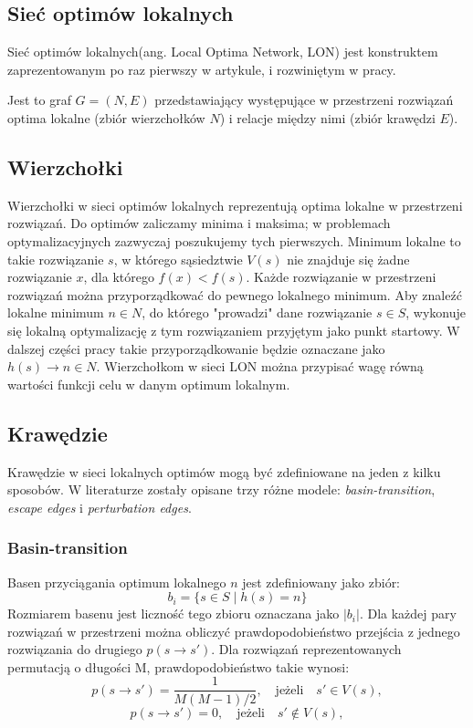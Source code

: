 \subsection{Sieć optimów lokalnych}
Sieć optimów lokalnych(ang. Local Optima Network, LON) jest konstruktem zaprezentowanym po raz pierwszy w artykule\cite{PhysRevE.78.066114},
i rozwiniętym w pracy\cite{DBLP:journals/corr/OchoaVDT14}.

Jest to graf $G = (N, E)$ przedstawiający występujące w przestrzeni rozwiązań optima lokalne (zbiór wierzchołków $N$)
i relacje między nimi (zbiór krawędzi $E$).

\subsection{Wierzchołki}
Wierzchołki w sieci optimów lokalnych reprezentują optima lokalne w przestrzeni rozwiązań.
Do optimów zaliczamy minima i maksima; w problemach optymalizacyjnych zazwyczaj poszukujemy tych pierwszych.
Minimum lokalne to takie rozwiązanie $s$, w którego sąsiedztwie $V(s)$ nie znajduje się żadne rozwiązanie $x$, dla którego $f(x) < f(s)$.
Każde rozwiązanie w przestrzeni rozwiązań można przyporządkować do pewnego lokalnego minimum.
Aby znaleźć lokalne minimum $n \in{N}$, do którego "prowadzi" dane rozwiązanie $s\in{S}$, wykonuje się lokalną optymalizację
z tym rozwiązaniem przyjętym jako punkt startowy.
W dalszej części pracy takie przyporządkowanie będzie oznaczane jako $h(s) \rightarrow n\in{N}$.
Wierzchołkom w sieci LON można przypisać wagę równą wartości funkcji celu w danym optimum lokalnym.

\subsection{Krawędzie}
Krawędzie w sieci lokalnych optimów mogą być zdefiniowane na jeden z kilku sposobów.
W literaturze\cite{DBLP:journals/corr/OchoaVDT14}\cite{DBLP:conf/gecco/TeixeiraP22} zostały opisane trzy różne modele:
\textit{basin-transition}, \textit{escape edges} i \textit{perturbation edges}.

\subsubsection{Basin-transition}
Basen przyciągania optimum lokalnego $n$ jest zdefiniowany jako zbiór:
$$b_i = \{s\in{S} \mid h(s) = n\}$$
Rozmiarem basenu jest liczność tego zbioru oznaczana jako $|b_i|$.
Dla każdej pary rozwiązań w przestrzeni można obliczyć prawdopodobieństwo przejścia z jednego rozwiązania do drugiego $p(s \rightarrow s')$.
Dla rozwiązań reprezentowanych permutacją o długości M, prawdopodobieństwo takie wynosi:
$$p(s \rightarrow s') = \frac{1}{M(M-1)/2}, \quad \text{jeżeli} \quad s'\in{V(s)},$$
$$p(s \rightarrow s') = 0, \quad \text{jeżeli} \quad s'\notin{V(s)},$$

